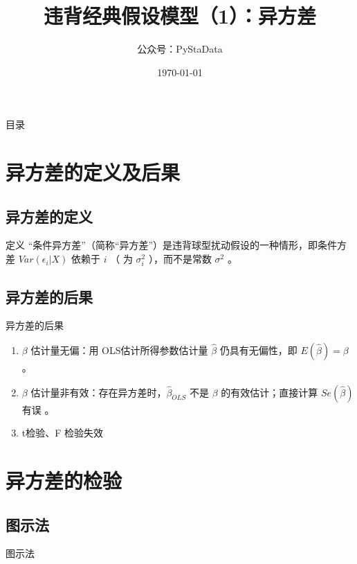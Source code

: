 \documentclass[UTF8]{ctexbeamer}
\begin{document}
\title{违背经典假设模型（1）：异方差}
\author{公众号：PyStaData}
\date{\today}

\frame{\titlepage} %


\begin{frame}{目录}
\begin{multicols}{2}
  \tableofcontents
\end{multicols}
\end{frame}



\section{异方差的定义及后果 }
\subsection{异方差的定义}
\begin{frame}{定义}
\linespread{1.5}
“条件异方差”（简称“异方差”）是违背球型扰动假设的一种情形，即条件方差 $Var(\epsilon_i|X)$ 依赖于 $i$ （ 为 $\sigma _i ^2$ ），而不是常数 $\sigma^2$ 。
\end{frame}

\subsection{异方差的后果}
\begin{frame}{异方差的后果}
\linespread{1.5}
\begin{enumerate}
  \item $\beta$ 估计量无偏：用 OLS估计所得参数估计量 $\hat \beta$ 仍具有无偏性，即 $E(\hat \beta) = \beta$ 。
  \item $\beta$ 估计量非有效：存在异方差时，$\hat \beta_{OLS}$ 不是 $\beta$ 的有效估计；直接计算 $Se(\hat \beta)$ 有误 。
  \item t检验、F 检验失效
\end{enumerate}
\end{frame}

\section{异方差的检验 }
\subsection{图示法}
\begin{frame}{图示法}
\end{frame}
\end{document}
